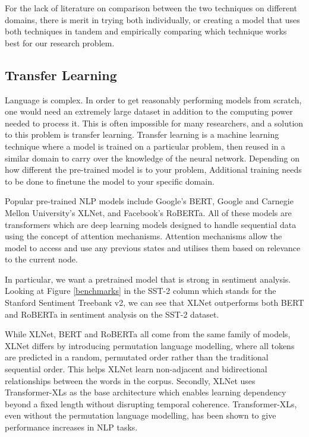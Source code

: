 \documentclass[12pt, a4paper]{article}
\begin{document}
For the lack of literature on comparison between the two techniques on different domains, there is merit in trying both individually, or creating a model that uses both techniques in tandem and empirically comparing which technique works best for our research problem.

\subsection{Transfer Learning}
Language is complex. In order to get reasonably performing models from scratch, one would need an extremely large dataset in addition to the computing power needed to process it. This is often impossible for many researchers, and a solution to this problem is transfer learning. Transfer learning is a machine learning technique where a model is trained on a particular problem, then reused in a similar domain to carry over the knowledge of the neural network. Depending on how different the pre-trained model is to your problem, Additional training needs to be done to finetune the model to your specific domain. \cite{ruder2019transfer}

Popular pre-trained NLP models include Google's BERT, Google and Carnegie Mellon University's XLNet, and Facebook's RoBERTa. All of these models are transformers which are deep learning models designed to handle sequential data using the concept of attention mechanisms. Attention mechanisms allow the model to access and use any previous states and utilises them based on relevance to the current node. \cite{vaswani2017attention} 

In particular, we want a pretrained model that is strong in sentiment analysis. Looking at Figure \ref{benchmarks} in the SST-2 column which stands for the Stanford Sentiment Treebank v2, we can see that XLNet \cite{yang2020xlnet} outperforms both BERT and RoBERTa in sentiment analysis on the SST-2 dataset.

While XLNet, BERT and RoBERTa all come from the same family of models, XLNet differs by introducing permutation language modelling, where all tokens are predicted in a random, permutated order rather than the traditional sequential order. This helps XLNet learn non-adjacent and bidirectional relationships between the words in the corpus. Secondly, XLNet uses Transformer-XLs as the base architecture which enables learning dependency beyond a fixed length without disrupting temporal coherence. \cite{dai2019transformerxl} Transformer-XLs, even without the permutation language modelling, has been shown to give performance increases in NLP tasks. 
\end{document}
